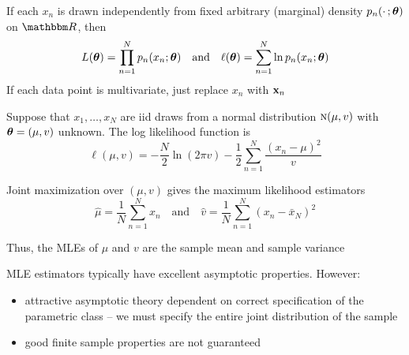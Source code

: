 \begin{frame}

    \vspace{2em}
    If each $x_n$ is drawn independently from fixed arbitrary
    (marginal) density $p_n(\cdot \,; {\boldsymbol \theta})$ on $\RR$, then
    \begin{equation*}
        \label{eq:deflf}
        L({\boldsymbol \theta}) = \prod_{n=1}^N p_n(x_n ; {\boldsymbol \theta})
        \quad \text{and} \quad
        \ell({\boldsymbol \theta}) = \sum_{n=1}^N \ln p_n(x_n ; {\boldsymbol \theta})
    \end{equation*}
    If each data point is multivariate, just replace $x_n$ with ${\mathbf x}_n$

    
\end{frame}

\begin{frame}

    \vspace{2em}
    \Eg
    Suppose that $x_1, \ldots, x_N$ are {\sc iid} draws from a normal
    distribution $\textrm{\sc n}(\mu, v)$ with ${\boldsymbol \theta} = (\mu, v)$ unknown.
    The log likelihood function is
    \begin{equation*}
        \ell(\mu, v) 
            = -\frac{N}{2} \ln (2 \pi v)
            - \frac{1}{2} \sum_{n=1}^N \frac{(x_n - \mu)^2}{v}
    \end{equation*}
    
    Joint maximization over $(\mu, v)$ gives the maximum likelihood estimators 
    \begin{equation*}
        \label{eq:mlen}
        \hat \mu = \frac{1}{N} \sum_{n=1}^N x_n
        \quad \text{and} \quad
        \hat v = \frac{1}{N} \sum_{n=1}^N (x_n - \bar x_N)^2
    \end{equation*}
    
    \vspace{.7em}
    Thus, the MLEs of $\mu$ and $v$ are the sample mean and sample
    variance
    
\end{frame}

\begin{frame}

    \vspace{2em}
    MLE estimators typically have excellent asymptotic properties. However:
    
    \begin{itemize}
        \item attractive asymptotic theory dependent on correct specification 
        of the parametric class -- we must specify the entire joint distribution of the sample
        \item  good finite sample properties are not guaranteed
    \end{itemize}
    
\end{frame}

